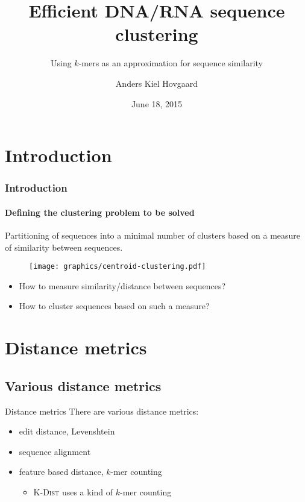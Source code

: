 \documentclass{beamer}
\title{Efficient DNA/RNA sequence clustering}
\subtitle{Using $k$-mers as an approximation for sequence similarity}
\author{Anders Kiel Hovgaard}
\institute{Department of Computer Science, University of Copenhagen}
\date{June 18, 2015}
\begin{document}
\frame{\titlepage}

\section{Introduction}

\begin{frame}
  \frametitle{Introduction}
  \framesubtitle{Defining the clustering problem to be solved}

  Partitioning of sequences into a minimal number of clusters based on a
  measure of similarity between sequences.

  \begin{figure}
    \texttt{[image: graphics/centroid-clustering.pdf]}
  \end{figure}

  \begin{itemize}
    \item How to measure similarity/distance between sequences?
    \item How to cluster sequences based on such a measure?
  \end{itemize}
\end{frame}

\section{Distance metrics}
\subsection{Various distance metrics}

\begin{frame}{Distance metrics}
  There are various distance metrics:

  \begin{itemize}
    \item edit distance, Levenshtein
    \item sequence alignment
    \item feature based distance, $k$-mer counting
      \begin{itemize}
        \item \textsc{K-Dist} uses a kind of $k$-mer counting
      \end{itemize}
  \end{itemize}
\end{frame}
\end{document}

